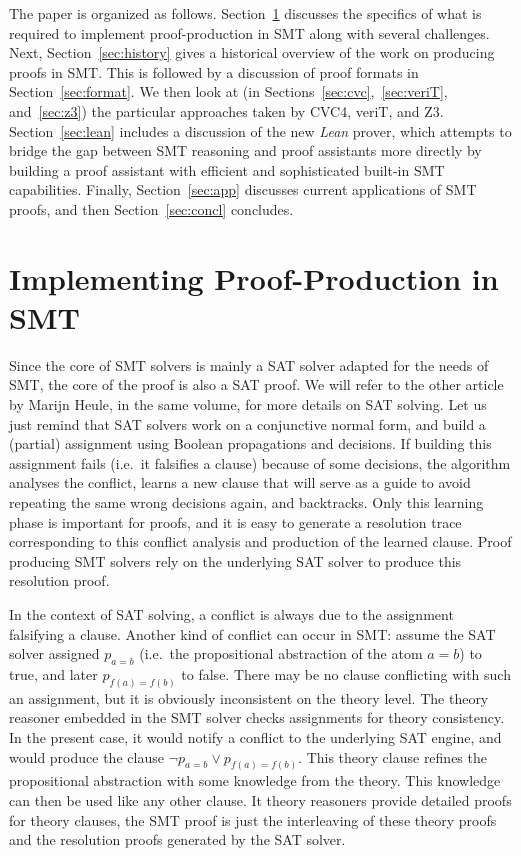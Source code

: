 \documentclass{llncs}
\newcommand{\Note}[1]{\textcolor{blue}{[#1]}}
\begin{document}
The paper is organized as follows.  Section~\ref{sec:impl} discusses the
specifics of what is required to implement proof-production in SMT along with
several challenges.  Next, Section~\ref{sec:history} gives a historical
overview of the work on producing proofs in SMT.  This is followed by a
discussion of proof formats in Section~\ref{sec:format}.  We then look at (in
Sections~\ref{sec:cvc},~\ref{sec:veriT}, and~\ref{sec:z3}) the particular
approaches taken by CVC4, veriT, and Z3. Section~\ref{sec:lean} includes a
discussion of the new \emph{Lean} prover, which attempts to bridge the gap
between SMT reasoning and proof assistants more directly by building a proof
assistant with efficient and sophisticated built-in SMT capabilities.  Finally,
Section~\ref{sec:app} discusses current applications of SMT proofs, and then
Section~\ref{sec:concl} concludes.

\section{Implementing Proof-Production in SMT}
\label{sec:impl}

Since the core of SMT solvers is mainly a SAT solver adapted for the needs of
SMT, the core of the proof is also a SAT proof.  We will refer to the other
article by Marijn Heule, in the same volume, for more details on SAT solving.
Let us just remind that SAT solvers work on a conjunctive normal form, and build
a (partial) assignment using Boolean propagations and decisions.  If building
this assignment fails (i.e.\ it falsifies a clause) because of some decisions,
the algorithm analyses the conflict, learns a new clause that will serve as a
guide to avoid repeating the same wrong decisions again, and backtracks.  Only
this learning phase is important for proofs, and it is easy to generate a
resolution trace corresponding to this conflict analysis and production of the
learned clause.  Proof producing SMT solvers rely on the underlying SAT solver
to produce this resolution proof.

In the context of SAT solving, a conflict is always due to the assignment
falsifying a clause.  Another kind of conflict can occur in SMT: assume the SAT
solver assigned $p_{a=b}$ (i.e.\ the propositional abstraction of the atom
$a=b$) to true, and later $p_{f(a) = f(b)}$ to false.  There may be no clause
conflicting with such an assignment, but it is obviously inconsistent on the
theory level.  The theory reasoner embedded in the SMT solver checks assignments
for theory consistency.  In the present case, it would notify a conflict to the
underlying SAT engine, and would produce the clause $\neg p_{a=b} \vee p_{f(a) =
  f(b)}$.  This theory clause refines the propositional abstraction with some
knowledge from the theory.  This knowledge can then be used like any other
clause.  It theory reasoners provide detailed proofs for theory clauses, the SMT
proof is just the interleaving of these theory proofs and the resolution proofs
generated by the SAT solver.
\end{document}
